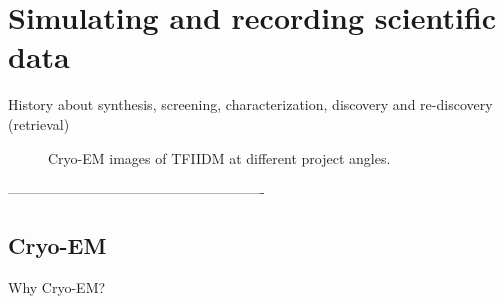 \section{Simulating and recording scientific data}\label{sec:mat}
History about synthesis, screening, characterization, discovery and re-discovery (retrieval)



\begin{figure}[h!]
\centering
{}
\hfil
{}
\caption{Cryo-EM images of TFIIDM at different project angles.}
\label{fig:cryo1}
\end{figure}

-------------------------------------------------------
\subsection{Cryo-EM}\label{subsec:cryo}
Why Cryo-EM?

